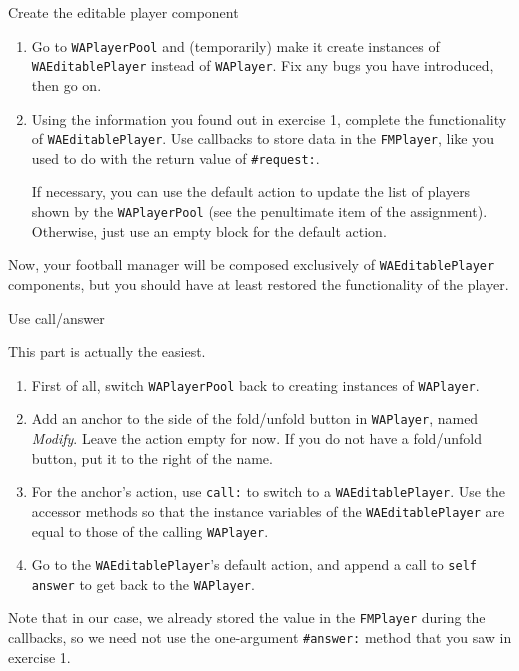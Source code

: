 \documentclass[a4paper,10pt]{scrartcl}
\begin{document}
\begin{exercise}{Create the editable player component}

\begin{enumerate}
\item Go to \texttt{WAPlayerPool} and (temporarily) make it create instances of
\texttt{WAEditablePlayer} instead of \texttt{WAPlayer}.  Fix any bugs you have
introduced, then go on.

\item Using the information you found out in exercise 1, complete the
functionality of \texttt{WAEditablePlayer}.  Use callbacks to store data in
the \texttt{FMPlayer}, like you used to do with the return value of
\texttt{\#request:}.

If necessary, you can use the
default action to update the list of players shown by the \texttt{WAPlayerPool}
(see the penultimate item of the assignment).  Otherwise, just use an
empty block for the default action.
\end{enumerate}

Now, your football manager will be composed exclusively of \texttt{WAEditablePlayer}
components, but you should have at least restored the functionality of the player.
\end{exercise}

\begin{exercise}{Use call/answer}

This part is actually the easiest.

\begin{enumerate}
\item First of all, switch \texttt{WAPlayerPool} back to creating instances
of \texttt{WAPlayer}.

\item Add an anchor to the side of the fold/unfold button in
\texttt{WAPlayer}, named \emph{Modify}.  Leave the action empty for now.
If you do not have a fold/unfold button, put it to the right of the name.

\item For the anchor's action, use \texttt{call:} to switch to a \texttt{WAEditablePlayer}.
Use the accessor methods so that the instance variables of the
\texttt{WAEditablePlayer} are equal to those of the calling \texttt{WAPlayer}.

\item Go to the \texttt{WAEditablePlayer}'s default action, and append
a call to \texttt{self answer} to get back to the \texttt{WAPlayer}.
\end{enumerate}

Note that in our case, we already stored the value in the \texttt{FMPlayer}
during the callbacks, so we need not use the one-argument \texttt{\#answer:}
method that you saw in exercise 1.
\end{exercise}
\end{document}
